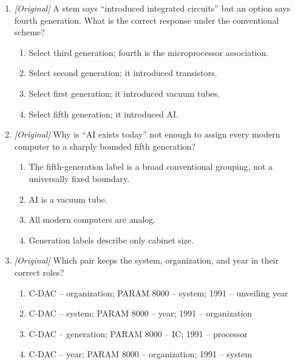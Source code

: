\documentclass[11pt]{article}
\begin{document}
\begin{enumerate}[label=\textbf{Q\arabic*.}, leftmargin=*]
\begin{enumerate}[label=\Alph*.]
    \item C-DAC is a type of microprocessor.
  \end{enumerate}
\item \textit{[Original]} A stem says ``introduced integrated circuits''
  but an option says fourth generation. What is the correct response under
  the conventional scheme?
  \begin{enumerate}[label=\Alph*.]
    \item Select third generation; fourth is the microprocessor association.
    \item Select second generation; it introduced transistors.
    \item Select first generation; it introduced vacuum tubes.
    \item Select fifth generation; it introduced AI.
  \end{enumerate}
\item \textit{[Original]} Why is ``AI exists today'' not enough to assign
  every modern computer to a sharply bounded fifth generation?
  \begin{enumerate}[label=\Alph*.]
    \item The fifth-generation label is a broad conventional grouping, not a
      universally fixed boundary.
    \item AI is a vacuum tube.
    \item All modern computers are analog.
    \item Generation labels describe only cabinet size.
  \end{enumerate}
\item \textit{[Original]} Which pair keeps the system, organization, and
  year in their correct roles?
  \begin{enumerate}[label=\Alph*.]
    \item C-DAC -- organization; PARAM 8000 -- system; 1991 -- unveiling year
    \item C-DAC -- system; PARAM 8000 -- year; 1991 -- organization
    \item C-DAC -- generation; PARAM 8000 -- IC; 1991 -- processor
    \item C-DAC -- year; PARAM 8000 -- organization; 1991 -- system
  \end{enumerate}


\end{enumerate}
\end{document}
